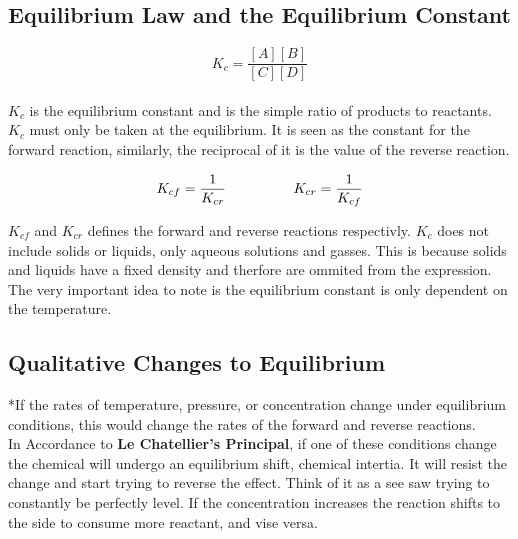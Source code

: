 \documentclass{article}
\begin{document}
\begin{paragraph}
\newpage
\subsection{Equilibrium Law and the Equilibrium Constant}

\begin{center}
\end{center}

\begin{equation}
  K_c = \frac{[A][B]}{[C][D]}
\end{equation}
\\

\noindent
$K_c$ is the equilibrium constant and is the simple ratio of products to reactants.
\\

$K_c$ must only be taken at the equilibrium. It is seen as the constant for the forward reaction, similarly, the reciprocal of it is the value of the reverse reaction.

\begin{equation}
  K_{cf} = \frac{1}{K_{cr}} \hspace{4pc} K_{cr} = \frac{1}{K_{cf}}
\end{equation}

$K_{c f}$ and $K_{c r}$ defines the forward and reverse reactions respectivly. $K_c$ does not include solids or liquids, only aqueous solutions and gasses. This is because solids and liquids have a fixed density and therfore are ommited from the expression.
\\

\noindent
The very important idea to note is the equilibrium constant is only dependent on the temperature.

\setcounter{subsection}{3}

\subsection{Qualitative Changes to Equilibrium}

*If the rates of temperature, pressure, or concentration change under equilibrium conditions, this would change the rates of the forward and reverse reactions.
\\

In Accordance to \textbf{Le Chatellier's Principal}, if one of these conditions change the chemical will undergo an equilibrium shift, chemical intertia. It will resist the change and start trying to reverse the effect. Think of it as a see saw trying to constantly be perfectly level. If the concentration increases the reaction shifts to the side to consume more reactant, and vise versa.\\


\end{paragraph}
\end{document}
